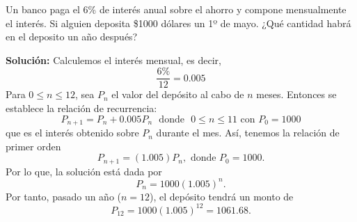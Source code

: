 \begin{myexample}
    Un banco paga el 6\% de interés anual sobre el ahorro y compone mensualmente el interés. Si alguien deposita \$1000 dólares un 1º de mayo. ¿Qué cantidad habrá en el deposito un año después?

    \tcblower
    \textbf{\color{jblueleft}Solución:} Calculemos el interés mensual, es decir,
    $$\frac{6\%}{12} = 0.005$$
    Para $0 \leq n \leq 12$, sea $P_n$ el valor del depósito al cabo de $n$ meses. Entonces se establece la relación de recurrencia:
    $$P_{n+1} = P_n + 0.005 P_n \text{ ~donde~ } 0 \leq n \leq 11 \text{ con } P_0 = 1000$$
    que es el interés obtenido sobre $P_n$ durante el mes. Así, tenemos la relación de primer orden
    $$P_{n+1} = (1.005)P_n, \text{ donde } P_0 = 1000.$$
    Por lo que, la solución está dada por
    $$P_n = 1000 (1.005)^{n}.$$
    Por tanto, pasado un año ($n = 12$), el depósito tendrá un monto de
    $$P_{12} = 1000 (1.005)^{12} = 1061.68.$$
\end{myexample}

